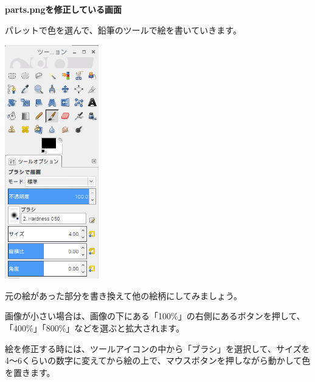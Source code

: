 \documentclass[a4paper,dvipdfmx]{jarticle}
\newcommand\textstyleqwerty[1]{#1}
\begin{document}
\bigskip


\bigskip


\bigskip


\bigskip


\bigskip


\bigskip


\bigskip


\bigskip


\bigskip

{\bfseries
parts.pngを修正している画面}


\bigskip


\bigskip


\bigskip


\bigskip


\bigskip

\textstyleqwerty{パレットで色を選んで、鉛筆のツールで絵を書いていきます。}

\begin{center}
\includegraphics[width=4.075cm,height=10.16cm]{text04-img/text04-img030.png}

\end{center}
元の絵があった部分を書き換えて他の絵柄にしてみましょう。


\bigskip

画像が小さい場合は、画像の下にある「100\%」の右側にあるボタンを押して、「400\%」「800\%」などを選ぶと拡大されます。

絵を修正する時には、ツールアイコンの中から「ブラシ」を選択して、サイズを4〜6くらいの数字に変えてから絵の上で、マウスボタンを押しながら動かして色を置きます。
\end{document}
